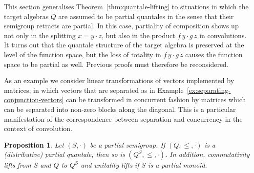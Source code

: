 \documentclass[12pt]{article}
\newtheorem{proposition}{Proposition}
\theoremstyle{definition}
\begin{document}
This section generalises Theorem~\ref{thm:quantale-lifting} to
situations in which the target algebras $Q$ are assumed to be partial
quantales in the sense that their semigroup retracts are partial. In
this case, partiality of composition shows up not only in the
splitting $x=y\cdot z$, but also in the product $f\, y\cdot g\, z$ in
convolutions. It turns out that the quantale structure of the target
algebra is preserved at the level of the function space, but the loss
of totality in $f\, y\cdot g\, z$ causes the function space to be
partial as well. Previous proofs must therefore be reconsidered.

As an example we consider linear transformations of vectors
implemented by matrices, in which vectors that are separated as in
Example~\ref{ex:separating-conjunction-vectors} can be transformed in
concurrent fashion by matrices which can be separated into non-zero
blocks along the diagonal.  This is a particular manifestation of the
correspondence between separation and concurrency in the context of
convolution.
\begin{proposition}\label{prop:partial-quantale-lifting}
  Let $(S,\cdot)$ be a partial semigroup. If $(Q,\le,\cdot)$ is a
  (distributive) partial quantale, then so is
  $(Q^S,\le,\cdot)$. In addition, commutativity lifts
  from $S$ and $Q$ to $Q^S$ and unitality lifts if $S$ is a partial
  monoid.
\end{proposition}
\end{document}
